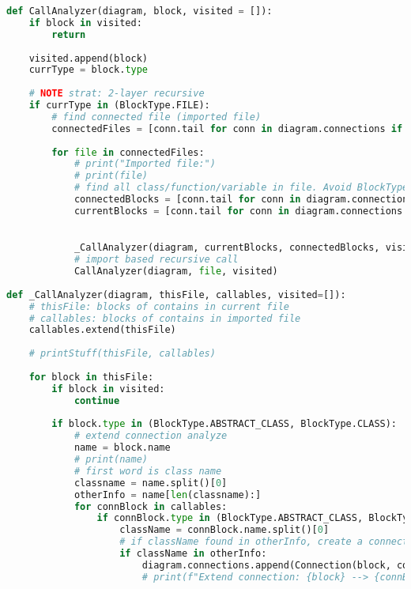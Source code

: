 
\begin{lstlisting}[language=Python, caption={$\texttt{CallAnalyzer}$ function.}, label={lst:11}]
    def CallAnalyzer(diagram, block, visited = []):
    if block in visited:
        return
    
    visited.append(block)
    currType = block.type
    
    # NOTE strat: 2-layer recursive
    if currType in (BlockType.FILE):
        # find connected file (imported file)
        connectedFiles = [conn.tail for conn in diagram.connections if conn.head == block and conn.type == ConnectionType.IMPORT]
        
        for file in connectedFiles:
            # print("Imported file:")
            # print(file)
            # find all class/function/variable in file. Avoid BlockType.FILE
            connectedBlocks = [conn.tail for conn in diagram.connections if conn.head == file and conn.type == ConnectionType.CONTAIN]
            currentBlocks = [conn.tail for conn in diagram.connections if conn.head == block and conn.type == ConnectionType.CONTAIN]

        
            _CallAnalyzer(diagram, currentBlocks, connectedBlocks, visited)
            # import based recursive call
            CallAnalyzer(diagram, file, visited)
        
def _CallAnalyzer(diagram, thisFile, callables, visited=[]):
    # thisFile: blocks of contains in current file
    # callables: blocks of contains in imported file
    callables.extend(thisFile)
    
    # printStuff(thisFile, callables)
    
    for block in thisFile:
        if block in visited:
            continue
        
        if block.type in (BlockType.ABSTRACT_CLASS, BlockType.CLASS):
            # extend connection analyze
            name = block.name
            # print(name)
            # first word is class name
            classname = name.split()[0]
            otherInfo = name[len(classname):]
            for connBlock in callables:
                if connBlock.type in (BlockType.ABSTRACT_CLASS, BlockType.CLASS):
                    className = connBlock.name.split()[0]
                    # if className found in otherInfo, create a connection ConnectionType.EXTEND
                    if className in otherInfo:
                        diagram.connections.append(Connection(block, connBlock, ConnectionType.EXTEND))
                        # print(f"Extend connection: {block} --> {connBlock}")
                

\end{lstlisting}
